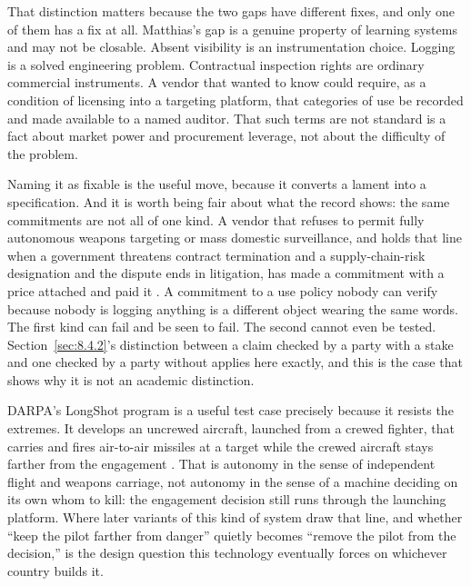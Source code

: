 That distinction matters because the two gaps have different fixes, and only one of them has a fix at all. Matthias's gap is a genuine property of learning systems and may not be closable. Absent visibility is an instrumentation choice. Logging is a solved engineering problem. Contractual inspection rights are ordinary commercial instruments. A vendor that wanted to know could require, as a condition of licensing into a targeting platform, that categories of use be recorded and made available to a named auditor. That such terms are not standard is a fact about market power and procurement leverage, not about the difficulty of the problem.

Naming it as fixable is the useful move, because it converts a lament into a specification. And it is worth being fair about what the record shows: the same commitments are not all of one kind. A vendor that refuses to permit fully autonomous weapons targeting or mass domestic surveillance, and holds that line when a government threatens contract termination and a supply-chain-risk designation and the dispute ends in litigation, has made a commitment with a price attached and paid it \autocite{crs2026pentagon}. A commitment to a use policy nobody can verify because nobody is logging anything is a different object wearing the same words. The first kind can fail and be seen to fail. The second cannot even be tested. Section~\ref{sec:8.4.2}'s distinction between a claim checked by a party with a stake and one checked by a party without applies here exactly, and this is the case that shows why it is not an academic distinction.

DARPA's LongShot program is a useful test case precisely because it resists the extremes. It develops an uncrewed aircraft, launched from a crewed fighter, that carries and fires air-to-air missiles at a target while the crewed aircraft stays farther from the engagement \autocite{darpa2026longshot}. That is autonomy in the sense of independent flight and weapons carriage, not autonomy in the sense of a machine deciding on its own whom to kill: the engagement decision still runs through the launching platform. Where later variants of this kind of system draw that line, and whether “keep the pilot farther from danger” quietly becomes “remove the pilot from the decision,” is the design question this technology eventually forces on whichever country builds it.


